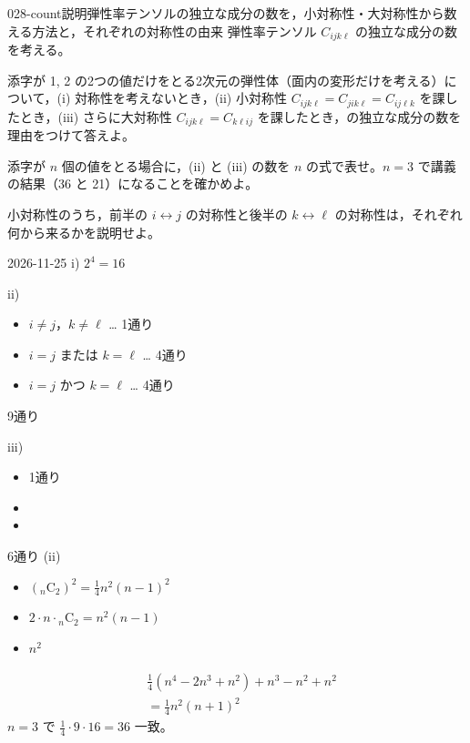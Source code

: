 \documentclass[uplatex,dvipdfmx,a4paper,11pt]{jsarticle}
\begin{document}
\begin{mondai}{028-count}{説明}{弾性率テンソルの独立な成分の数を，小対称性・大対称性から数える方法と，それぞれの対称性の由来}
弾性率テンソル $C_{ijk\ell}$ の独立な成分の数を考える。
  \begin{shoumon}
    \item 添字が 1, 2 の2つの値だけをとる2次元の弾性体（面内の変形だけを考える）について，(i) 対称性を考えないとき，(ii) 小対称性 $C_{ijk\ell}=C_{jik\ell}=C_{ij\ell k}$ を課したとき，(iii) さらに大対称性 $C_{ijk\ell}=C_{k\ell ij}$ を課したとき，の独立な成分の数を理由をつけて答えよ。
    \item 添字が $n$ 個の値をとる場合に，(ii) と (iii) の数を $n$ の式で表せ。$n=3$ で講義の結果（36 と 21）になることを確かめよ。
    \item 小対称性のうち，前半の $i\leftrightarrow j$ の対称性と後半の $k\leftrightarrow\ell$ の対称性は，それぞれ何から来るかを説明せよ。
  \end{shoumon}
\begin{kotaeutsushi}{2026-11-25}
i) $2^{4}=16$

ii)
\begin{itemize}[leftmargin=2em,itemsep=0pt,topsep=2pt]
\item[①] $i\neq j$，$k\neq\ell$ … 1通り
\item[②] $i=j$ または $k=\ell$ … 4通り
\item[③] $i=j$ かつ $k=\ell$ … 4通り
\end{itemize}
9通り

iii)
\begin{itemize}[leftmargin=2em,itemsep=0pt,topsep=2pt]
\item[①] 1通り
\item[②] 
\item[③] 
\end{itemize}
6通り
(ii)
\begin{itemize}[leftmargin=2em,itemsep=0pt,topsep=2pt]
\item[①] $({}_{n}\mathrm{C}_{2})^{2}=\frac{1}{4}n^{2}(n-1)^{2}$
\item[②] $2\cdot n\cdot{}_{n}\mathrm{C}_{2}=n^{2}(n-1)$
\item[③] $n^{2}$
\end{itemize}
\begin{align*}
&\frac{1}{4}(n^{4}-2n^{3}+n^{2})+n^{3}-n^{2}+n^{2}\\
&=\frac{1}{4}n^{2}(n+1)^{2}
\end{align*}
$n=3$ で $\frac{1}{4}\cdot9\cdot16=36$ 一致。


\end{kotaeutsushi}
\end{mondai}
\end{document}
